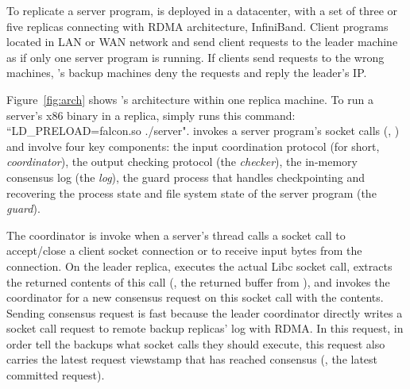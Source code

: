 

To replicate a server program, \xxx is deployed in a datacenter, with a set of 
three or five replicas connecting with RDMA architecture, InfiniBand. Client 
programs located in LAN or WAN network and send client requests to the leader 
machine as if only one server program is running. If clients send requests to 
the wrong machines, \xxx's backup machines deny the requests and reply the 
leader's IP.

Figure~\ref{fig:arch} shows \xxx's architecture within one replica machine. To 
run a server's x86 binary in a replica, \xxx simply runs this command: 
``LD\_PRELOAD=falcon.so ./server". \xxx invokes a server program's socket calls 
(\eg, \recv) and involve four key components: the input coordination 
protocol (for short, \emph{coordinator}), the output checking protocol (the 
\emph{checker}), the in-memory consensus log (the \emph{log}), the guard process 
that handles checkpointing and recovering the process state and file system 
state of the server program (the \emph{guard}).



The coordinator is invoke when a server's thread calls a socket call to 
accept/close a client socket connection or to receive input bytes from the 
connection. On the leader replica, \xxx executes the actual Libc socket 
call, extracts the returned contents of this call (\eg, the returned buffer 
from \recv), and invokes the coordinator for a new consensus request on this 
socket call with the contents. Sending consensus request is fast because the 
leader coordinator directly writes a socket call request to remote backup 
replicas' log with RDMA. In this request, in order tell the backups what socket 
calls they should execute, this request also carries the latest request 
viewstamp that has reached consensus (\ie, the latest committed request).

